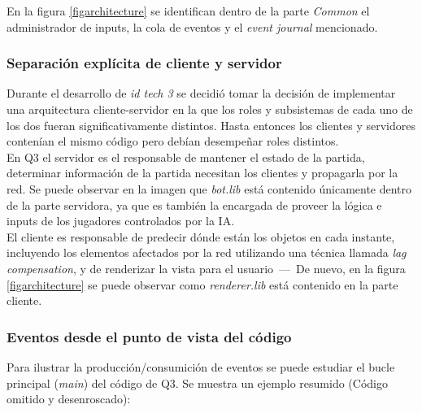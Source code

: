 \documentclass[a4paper,12pt]{report}
\begin{document}
	En la figura \ref{figarchitecture} se identifican dentro de la parte \textit{Common} el administrador de inputs, la cola de eventos y el \textit{event journal} mencionado.
	
	\subsubsection{Separación explícita de cliente y servidor}
	
	Durante el desarrollo de \textit{id tech 3} se decidió tomar la decisión de implementar una arquitectura cliente-servidor en la que los roles y subsistemas de cada uno de los dos fueran significativamente distintos. Hasta entonces los clientes y servidores contenían el mismo código pero debían desempeñar roles distintos.\\
	
	En Q3 el servidor es el responsable de mantener el estado de la partida, determinar información de la partida necesitan los clientes y propagarla por la red. Se puede observar en la imagen que \textit{bot.lib} está contenido únicamente dentro de la parte servidora, ya que es también la encargada de proveer la lógica e inputs de los jugadores controlados por la IA.\\
	
	El cliente es responsable de predecir dónde están los objetos en cada instante, incluyendo los elementos afectados por la red utilizando una técnica llamada \textit{lag compensation}, y de renderizar la vista para el usuario \,---\, De nuevo, en la figura  \ref{figarchitecture} se puede observar como\textit{ renderer.lib} está contenido en la parte cliente. \cite{architecture}\\
	
	\subsubsection{Eventos desde el punto de vista del código}
	
	Para ilustrar la producción/consumición de eventos se puede estudiar el bucle principal (\textit{main}) del código de Q3. Se muestra un ejemplo resumido (Código omitido y desenroscado):
	
\end{document}
